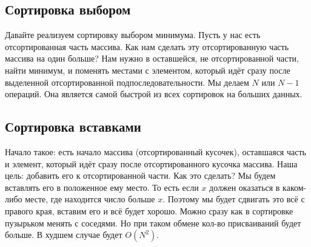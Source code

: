 \documentclass[a4paper,12pt]{article}
\begin{document}
\subsection{Сортировка выбором}
Давайте реализуем сортировку выбором минимума. Пусть у нас есть отсортированная часть массива. Как нам сделать эту отсортированную часть массива на один больше? Нам нужно в оставшейся, не отсортированной части, найти минимум, и поменять местами с элементом, который идёт сразу после выделенной отсортированной подпоследовательности. Мы делаем $N$ или $N - 1$ операций. Она является самой быстрой из всех сортировок на больших данных.
\subsection{Сортировка вставками}
Начало такое: есть начало массива (отсортированный кусочек), оставшаяся часть и элемент, который идёт сразу после отсортированного кусочка массива. Наша цель: добавить его к отсортированной части. Как это сделать? Мы будем вставлять его в положенное ему место. То есть если $x$ должен оказаться в каком-либо месте, где находится число больше $x$. Поэтому мы будет сдвигать это всё с правого края, вставим его и всё будет хорошо. Можно сразу как в сортировке пузырьком менять с соседями. Но при таком обмене кол-во присваиваний будет больше. В худшем случае будет $O(N^2)$.
\end{document}
